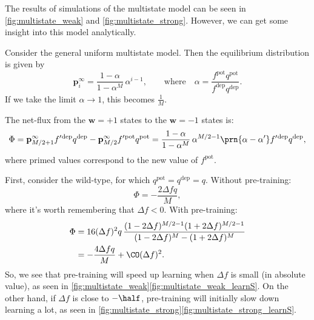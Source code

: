 \documentclass[12pt]{article}
\newcommand{\pr}{\mathbf{p}}
\newcommand{\eq}{\pr^\infty}
\newcommand{\w}{\mathbf{w}}
\newcommand{\pot}{^{\text{pot}}}
\newcommand{\dep}{^{\text{dep}}}
\begin{document}



The results of simulations of the multistate model can be seen in \autoref{fig:multistate_weak} and \autoref{fig:multistate_strong}.
However, we can get some insight into this model analytically.



Consider the general uniform multistate model.
Then the equilibrium distribution is given by
%
\begin{equation}\label{eq:mutltieq}
  \eq_i = \frac{1-\alpha}{1-\alpha^M}\,\alpha^{i-1},
  \qquad \text{where} \quad
  \alpha=\frac{f\pot q\pot}{f\dep q\dep}.
\end{equation}
%
If we take the limit $\alpha\rightarrow1$, this becomes $\frac{1}{M}$.

The net-flux from the $\w=+1$ states to the $\w=-1$ states is:
%
\begin{equation}\label{eq:multiflux}
  \Phi = \eq_{M/2+1}f'{}\dep q\dep - \eq_{M/2}f'{}\pot q\pot = \frac{1-\alpha}{1-\alpha^M}\,\alpha^{M/2-1}\prn{\alpha-\alpha'}f'{}\dep q\dep,
\end{equation}
%
where primed values correspond to the new value of $f\pot$.

First, consider the wild-type, for which $q\pot=q\dep=q$.
Without pre-training:
%
\begin{equation}\label{eq:multiWTnopre}
  \Phi = -\frac{2\Delta fq}{M},
\end{equation}
%
where it's worth remembering that $\Delta f<0$.
With pre-training:
%
\begin{equation}\label{eq:multiWTpre}
\begin{aligned}
  \Phi &= 16(\Delta f)^2q \, \frac{(1-2\Delta f)^{M/2-1} (1+2\Delta f)^{M/2-1}}
          {(1-2\Delta f)^M - (1+2\Delta f)^M} \\
       &= -\frac{4\Delta fq}{M} + \CO(\Delta f)^2.
\end{aligned}
\end{equation}
%
So, we see that pre-training will speed up learning when $\Delta f$ is small (in absolute value), as seen in \autoref{fig:multistate_weak}\ref{fig:multistate_weak_learnS}.
On the other hand, if $\Delta f$ is close to $-\half$, pre-training will initially slow down learning a lot, as seen in \autoref{fig:multistate_strong}\ref{fig:multistate_strong_learnS}.
\end{document}
